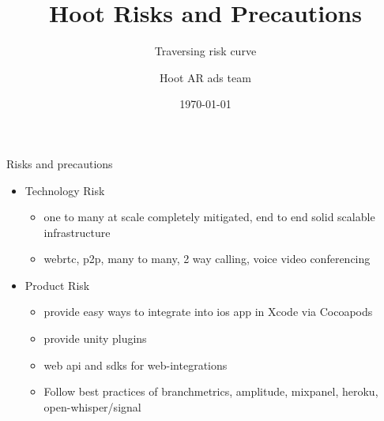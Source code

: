 \documentclass[12pt]{beamer}
\title{ Hoot Risks and Precautions}
\subtitle{Traversing risk curve}
\date{\today}
\author{Hoot AR ads team}
\institute{Hoot Live inc., a Delaware C-corp}
\begin{document}
\maketitle



\begin{frame}[fragile]{Risks and precautions}
  \begin{itemize}[<+-| alert@+>]%
	  
\item[ ]{Technology Risk    }
\begin{itemize}[<+-| alert@+>]
\item one to many at scale completely mitigated, end to end solid scalable infrastructure
\item webrtc, p2p, many to many, 2 way calling, voice video conferencing
\end{itemize}
\item[ ]{Product Risk}
\begin{itemize}[<+-| alert@+>]
\item provide easy ways to integrate into ios app in Xcode via Cocoapods
\item provide unity plugins
\item  web api and sdks for web-integrations
\item  Follow best practices of branchmetrics, amplitude, mixpanel, heroku, open-whisper/signal
\end{itemize}


\end{itemize}

\end{frame}
\end{document}
